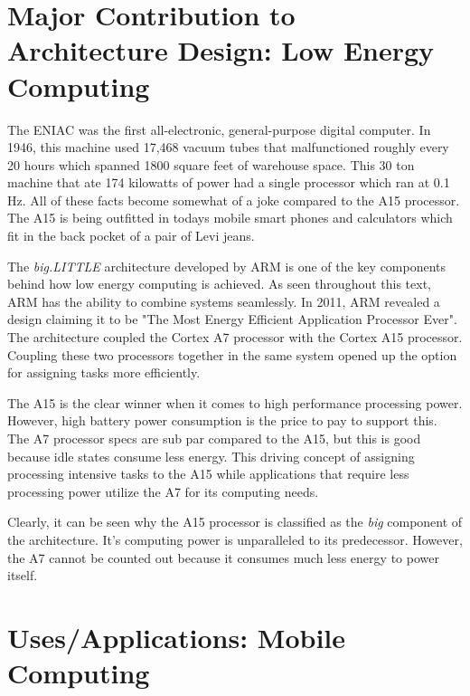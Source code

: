 \documentclass[12pt]{scrreprt}
\begin{document}
{\let\clearpage\relax\chapter{Major Contribution to Architecture Design: Low Energy Computing}}

	The ENIAC was the first all-electronic, general-purpose digital computer.
	In 1946, this machine used 17,468 vacuum tubes that malfunctioned roughly every 20 hours which spanned 1800 square feet of warehouse space.
	This 30 ton machine that ate 174 kilowatts of power had a single processor which ran at 0.1 Hz.
	All of these facts become somewhat of a joke compared to the A15 processor.
	The A15 is being outfitted in todays mobile smart phones and calculators which fit in the back pocket of a pair of Levi jeans.
	
	The \textit{big.LITTLE} architecture developed by ARM is one of the key components behind how low energy computing is achieved.
	As seen throughout this text, ARM has the ability to combine systems seamlessly.
	In 2011, ARM revealed a design claiming it to be "The Most Energy Efficient Application Processor Ever".
	The architecture coupled the Cortex A7 processor with the Cortex A15 processor.
	Coupling these two processors together in the same system opened up the option for assigning tasks more efficiently.

	The A15 is the clear winner when it comes to high performance processing power.
	However, high battery power consumption is the price to pay to support this.
	The A7 processor specs are sub par compared to the A15, but this is good because idle states consume less energy.
	This driving concept of assigning processing intensive tasks to the A15 while applications that require less processing power utilize the A7 for its computing needs.

	Clearly, it can be seen why the A15 processor is classified as the \textit{big} component of the architecture.
	It's computing power is unparalleled to its predecessor.
	However, the A7 cannot be counted out because it consumes much less energy to power itself.

{\let\clearpage\relax\chapter{Uses/Applications: Mobile Computing}}
\end{document}
